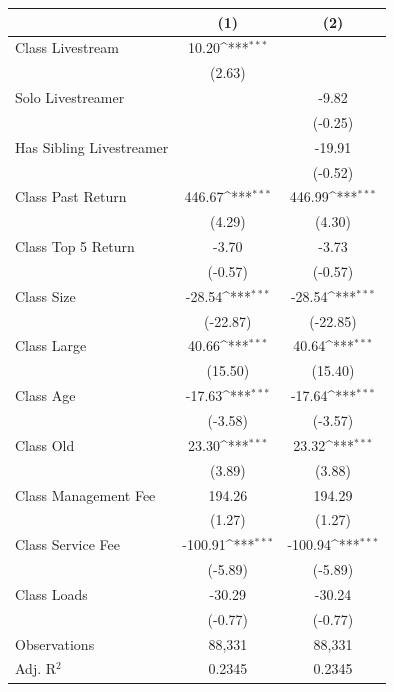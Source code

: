 {
\def\sym#1{\ifmmode^{#1}\else\(^{#1}\)\fi}
\begin{tabular}{l*{2}{c}}
\toprule
                    &\multicolumn{1}{c}{(1)}         &\multicolumn{1}{c}{(2)}         \\
\midrule
Class Livestream    &       10.20\sym{***}&                     \\
                    &      (2.63)         &                     \\
\addlinespace
Solo Livestreamer   &                     &       -9.82         \\
                    &                     &     (-0.25)         \\
\addlinespace
Has Sibling Livestreamer&                     &      -19.91         \\
                    &                     &     (-0.52)         \\
\addlinespace
Class Past Return   &      446.67\sym{***}&      446.99\sym{***}\\
                    &      (4.29)         &      (4.30)         \\
\addlinespace
Class Top 5 Return  &       -3.70         &       -3.73         \\
                    &     (-0.57)         &     (-0.57)         \\
\addlinespace
Class Size          &      -28.54\sym{***}&      -28.54\sym{***}\\
                    &    (-22.87)         &    (-22.85)         \\
\addlinespace
Class Large         &       40.66\sym{***}&       40.64\sym{***}\\
                    &     (15.50)         &     (15.40)         \\
\addlinespace
Class Age           &      -17.63\sym{***}&      -17.64\sym{***}\\
                    &     (-3.58)         &     (-3.57)         \\
\addlinespace
Class Old           &       23.30\sym{***}&       23.32\sym{***}\\
                    &      (3.89)         &      (3.88)         \\
\addlinespace
Class Management Fee&      194.26         &      194.29         \\
                    &      (1.27)         &      (1.27)         \\
\addlinespace
Class Service Fee   &     -100.91\sym{***}&     -100.94\sym{***}\\
                    &     (-5.89)         &     (-5.89)         \\
\addlinespace
Class Loads         &      -30.29         &      -30.24         \\
                    &     (-0.77)         &     (-0.77)         \\
\midrule
Observations        &      88,331         &      88,331         \\
Adj. R$^{2}$        &      0.2345         &      0.2345         \\
\bottomrule
\end{tabular}
}
